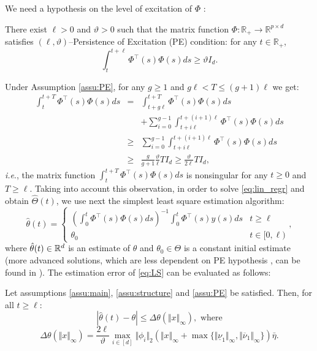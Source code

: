 \documentclass[letterpaper, 10 pt, conference]{ieeeconf}  %
\begin{document}
We need a hypothesis on the level of excitation of $\Phi$ \cite{Morgan1977}:
\begin{assumption}
\label{assu:PE} There exist $\ell>0$ and $\vartheta>0$ such that
the matrix function $\Phi:\mathbb{R}_{+}\to\mathbb{R}^{p\times d}$
satisfies $(\ell,\vartheta)$--Persistence of Excitation (PE) condition: for any $t\in\mathbb{R_{+}}$,
\[
\int_{t}^{t+\ell}\Phi^{\top}(s)\Phi(s)ds\ge\vartheta I_{d}.
\]

\end{assumption}
Under Assumption \ref{assu:PE}, for any $g\geq1$ and $g\ell<T\leq(g+1)\ell$
we get:
\begin{align*}
\int_{t}^{t+T}\Phi^{\top}(s)\Phi(s)ds & = & \int_{t+g\ell}^{t+T}\Phi^{\top}(s)\Phi(s)ds\\
& & + \sum_{i=0}^{g-1}\int_{t+i\ell}^{t+(i+1)\ell}\Phi^{\top}(s)\Phi(s)ds\\
& \geq & \sum_{i=0}^{g-1}\int_{t+i\ell}^{t+(i+1)\ell}\Phi^{\top}(s)\Phi(s)ds\\
& \geq & \frac{g}{g+1}\frac{\vartheta}{\ell}TI_{d}\geq\frac{\vartheta}{2\ell}TI_{d},
\end{align*}
\emph{i.e}., the matrix function $\int_{t}^{t+T}\Phi^{\top}(s)\Phi(s)ds$
is nonsingular for any $t\geq0$ and $T\geq\ell$.
Taking into account this observation, in order to solve \eqref{eq:lin_regr}
and obtain $\hat{\Theta}(t)$, we use next the simplest least
square estimation algorithm:
\begin{equation}
\hat{\theta}(t)=\begin{cases}
\left(\int_{0}^{t}\Phi^{\top}(s)\Phi(s)ds\right)^{-1}\int_{0}^{t}\Phi^{\top}(s)y(s)ds & t\geq\ell\\
\theta_{0} & t\in[0,\ell)
\end{cases},\label{eq:LS}
\end{equation}
where $\hat{\theta}(t)\in\mathbb{R}^{d}$ is an estimate of $\theta$ and
$\theta_{0}\in\Theta$ is a constant initial estimate (more advanced
solutions, which are less dependent on PE hypothesis \cite{Efimov2015,Efimov_PE2018},
can be found in \cite{Chowdhary2012,Wang2019a}). The estimation error
of \eqref{eq:LS} can be evaluated as follows: 
\begin{proposition}
\label{prop:LS} Let assumptions \ref{assu:main}, \ref{assu:structure}
and \ref{assu:PE} be satisfied. Then, for all $t\geq\ell$:
\[
|\hat{\theta}(t)-\theta|\leq\Delta\theta(\Vert x\Vert_{\infty}),\text{ where}
\]
\[
\Delta\theta(\Vert x\Vert_{\infty})=\frac{2\ell}{\vartheta}\max_{i\in[d]}\Vert\phi_{i}\Vert_{2}(\Vert x\Vert_{\infty}+\max\{\Vert\underline{\nu}_{1}\Vert_{\infty},\Vert\overline{\nu}_{1}\Vert_{\infty}\})\bar{\eta}.
\]
\end{proposition}
\end{document}
